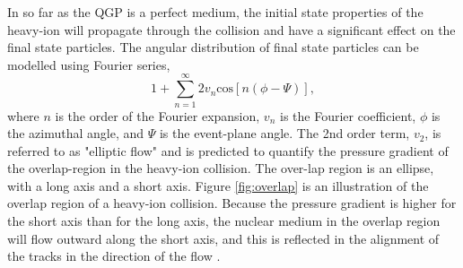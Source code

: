 In so far as the QGP is a perfect medium, the initial state properties of the heavy-ion will propagate through the collision and have a significant effect on the final state particles. The angular distribution of final state particles can be modelled using Fourier series,
\begin{equation}
 1+\sum^{\infty}_{n=1}2v_{n}\mathrm{cos}\left[n\left(\phi-\Psi\right)\right],
\end{equation}
where $n$ is the order of the Fourier expansion, $v_n$ is the Fourier coefficient, $\phi$ is the azimuthal angle, and $\Psi$ is the event-plane angle. The 2nd order term, $v_2$, is referred to as "elliptic flow" and is predicted to quantify the pressure gradient of the overlap-region in the heavy-ion collision. The over-lap region is an ellipse, with a long axis and a short axis. Figure \ref{fig:overlap} is an illustration of the overlap region of a heavy-ion collision. Because the pressure gradient is higher for the short axis than for the long axis, the nuclear medium in the overlap region will flow outward along the short axis, and this is reflected in the alignment of the tracks in the direction of the flow \cite{Abelev:2012ola}\cite{Ollitrault:1992bk}\cite{Sorensen:2009cz}\cite{Bhalerao:2003yq}\cite{Borghini:2001zr}\cite{Ackermann:2000tr}\cite{Borghini:2004ke}. 

